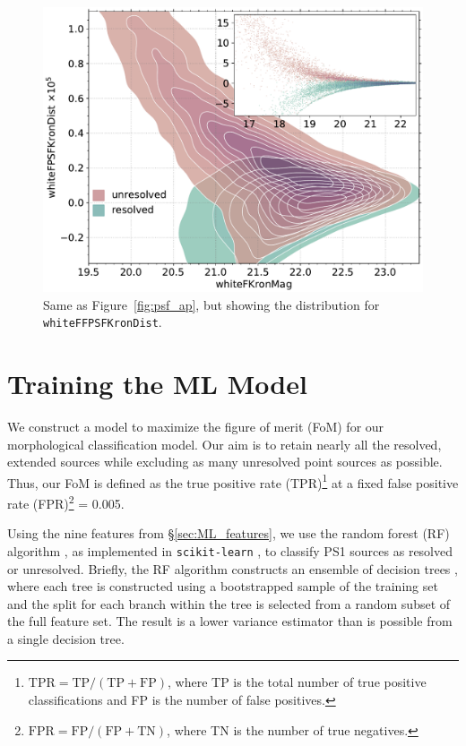 \documentclass[twocolumn]{aastex63}
\begin{document}
\begin{figure}
    \centering
    \includegraphics[width=\columnwidth]{./figures/whiteFPSFKronDist.pdf}
    \caption{Same as Figure~\ref{fig:psf_ap}, but showing the distribution for
    \texttt{whiteFFPSFKronDist}.}
    \label{fig:psf_kron}
\end{figure}  

\section{Training the ML Model}\label{sec:ML_model}

We construct a model to maximize the figure of merit (FoM) for our
morphological classification model. Our aim is to retain nearly all the
resolved, extended sources while excluding as many unresolved point sources as
possible. Thus, our FoM is defined as the true positive rate
(TPR)\footnote{$\mathrm{TPR} = \mathrm{TP}/(\mathrm{TP} + \mathrm{FP})$, where
TP is the total number of true positive classifications and FP is the number
of false positives.} at a fixed false positive rate
(FPR)\footnote{$\mathrm{FPR} = \mathrm{FP}/(\mathrm{FP}+\mathrm{TN})$, where
TN is the number of true negatives.} = 0.005.

Using the nine features from \S\ref{sec:ML_features}, we use the random forest
(RF) algorithm \citep{Breiman01}, as implemented in \texttt{scikit-learn}
\citep{Pedregosa11}, to classify PS1 sources as resolved or unresolved.
Briefly, the RF algorithm constructs an ensemble of decision trees
\citep{Breiman84}, where each tree is constructed using a bootstrapped sample
of the training set \citep[a method known as ``bagging'';][]{Breiman96} and
the split for each branch within the tree is selected from a random subset of
the full feature set. The result is a lower variance estimator than is
possible from a single decision tree.
\end{document}
